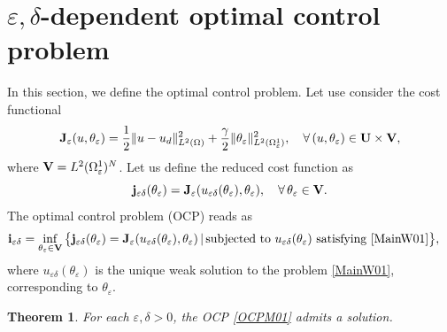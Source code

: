 \documentclass[11pt,a4paper]{article}
\numberwithin{equation}{section}
\def\O{\Omega}
\def\d{\delta}
\def\e{\varepsilon}
\def\ed{{\varepsilon\delta}}
\def\X{\times }
\def\Gi{{\bf i}}
\def\Gj{{\bf j}}
\def\GJ{{\bf J}}
\def\GU{{\bf U}}
\def\GV{{\bf V}}
\newtheorem{theorem}{Theorem}[section]
\begin{document}
\section{$\e,\d$-dependent optimal control problem}\label{S04}
In this section, we define the optimal control problem. Let use consider the cost functional 
$$\GJ_\e(u,\theta_\e)={1\over 2}\|u-u_d\|^2_{L^2(\O)}+{\gamma\over 2}\|\theta_\e\|^2_{L^2(\O^1_\e)},\quad \forall\,(u,\theta_\e)\in \GU\X \GV,$$
where $\GV=L^2(\O^1_\e)^N$. Let us define the reduced cost function as
$$\Gj_\ed(\theta_\e)=\GJ_\e(u_\ed(\theta_\e),\theta_\e),\quad \forall\,\theta_\e\in\GV.$$
The optimal control problem (OCP) reads as
\begin{equation}\label{OCPM01}
	\begin{aligned}
		&\Gi_\ed=\inf_{\theta_\e\in\GV}\big\{\Gj_\ed(\theta_\e)=\GJ_\e(u_\ed(\theta_\e),\theta_\e)\,|\,\text{subjected to $u_\ed(\theta_\e)$ satisfying \eqref{MainW01}}\big\},
	\end{aligned}
\end{equation}
where $u_\ed(\theta_\e)$ is the unique weak solution to the problem \eqref{MainW01}, corresponding to $\theta_\e$.
\begin{theorem}\label{Th2}
	For each $\e,\d>0$, the OCP \eqref{OCPM01} admits a solution.
\end{theorem}
\end{document}
